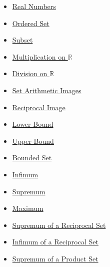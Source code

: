 \begin{dependencies}
\begin{itemize}
  \item \hyperref[def:reals]{Real Numbers}
  \item \hyperref[def:ordered-set]{Ordered Set}
  \item \hyperref[def:subset]{Subset}
  \item \hyperref[def:multiplication-on-r]{Multiplication on $\mathbb{R}$}
  \item \hyperref[def:division-on-r]{Division on $\mathbb{R}$}
  \item \hyperref[def:set-arithmetic-images]{Set Arithmetic Images}
  \item \hyperref[def:reciprocal-image]{Reciprocal Image}
  \item \hyperref[def:real-lower-bound]{Lower Bound}
  \item \hyperref[def:real-upper-bound]{Upper Bound}
  \item \hyperref[def:bounded]{Bounded Set}
  \item \hyperref[def:infimum]{Infimum}
  \item \hyperref[def:supremum]{Supremum}
  \item \hyperref[def:maximum]{Maximum}
  \item \hyperref[thm:supremum-reciprocal-set]{Supremum of a Reciprocal Set}
  \item \hyperref[thm:infimum-reciprocal-set]{Infimum of a Reciprocal Set}
  \item \hyperref[thm:supremum-product-set]{Supremum of a Product Set}
\end{itemize}
\end{dependencies}

